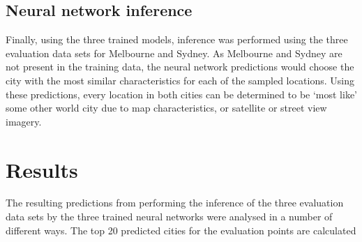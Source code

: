 \documentclass[final,3p,times,authoryear]{elsarticle}
\begin{document}
%
%
%
%
%



\subsection{Neural network inference}\label{sec:methods5}    
Finally, using the three trained models, inference was performed using the three evaluation data sets for Melbourne and Sydney. As Melbourne and Sydney are not present in the training data, the neural network predictions would choose the city with the most similar characteristics for each of the sampled locations. Using these predictions, every location in both cities can be determined to be `most like' some other world city due to map characteristics, or satellite or street view imagery.





\section{Results}\label{sec:results}
The resulting predictions from performing the inference of the three evaluation data sets by the three trained neural networks were analysed in a number of different ways. The top 20 predicted cities for the evaluation points are calculated 
\end{document}
